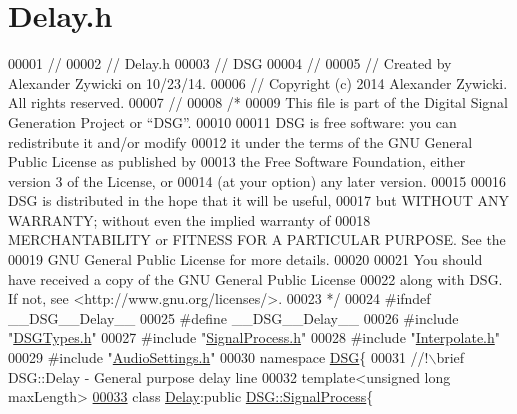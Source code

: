 \hypertarget{_delay_8h_source}{\section{Delay.\+h}
\label{_delay_8h_source}
}

\begin{DoxyCode}
00001 \textcolor{comment}{//}
00002 \textcolor{comment}{//  Delay.h}
00003 \textcolor{comment}{//  DSG}
00004 \textcolor{comment}{//}
00005 \textcolor{comment}{//  Created by Alexander Zywicki on 10/23/14.}
00006 \textcolor{comment}{//  Copyright (c) 2014 Alexander Zywicki. All rights reserved.}
00007 \textcolor{comment}{//}
00008 \textcolor{comment}{/*}
00009 \textcolor{comment}{ This file is part of the Digital Signal Generation Project or “DSG”.}
00010 \textcolor{comment}{}
00011 \textcolor{comment}{ DSG is free software: you can redistribute it and/or modify}
00012 \textcolor{comment}{ it under the terms of the GNU General Public License as published by}
00013 \textcolor{comment}{ the Free Software Foundation, either version 3 of the License, or}
00014 \textcolor{comment}{ (at your option) any later version.}
00015 \textcolor{comment}{}
00016 \textcolor{comment}{ DSG is distributed in the hope that it will be useful,}
00017 \textcolor{comment}{ but WITHOUT ANY WARRANTY; without even the implied warranty of}
00018 \textcolor{comment}{ MERCHANTABILITY or FITNESS FOR A PARTICULAR PURPOSE.  See the}
00019 \textcolor{comment}{ GNU General Public License for more details.}
00020 \textcolor{comment}{}
00021 \textcolor{comment}{ You should have received a copy of the GNU General Public License}
00022 \textcolor{comment}{ along with DSG.  If not, see <http://www.gnu.org/licenses/>.}
00023 \textcolor{comment}{ */}
00024 \textcolor{preprocessor}{#ifndef \_\_DSG\_\_Delay\_\_}
00025 \textcolor{preprocessor}{#define \_\_DSG\_\_Delay\_\_}
00026 \textcolor{preprocessor}{#include "\hyperlink{_d_s_g_types_8h}{DSGTypes.h}"}
00027 \textcolor{preprocessor}{#include "\hyperlink{_signal_process_8h}{SignalProcess.h}"}
00028 \textcolor{preprocessor}{#include "\hyperlink{_interpolate_8h}{Interpolate.h}"}
00029 \textcolor{preprocessor}{#include "\hyperlink{_audio_settings_8h}{AudioSettings.h}"}
00030 \textcolor{keyword}{namespace }\hyperlink{namespace_d_s_g}{DSG}\{\textcolor{comment}{}
00031 \textcolor{comment}{    //!\(\backslash\)brief DSG::Delay - General purpose delay line}
00032 \textcolor{comment}{}    \textcolor{keyword}{template}<\textcolor{keywordtype}{unsigned} \textcolor{keywordtype}{long} maxLength>
\hypertarget{_delay_8h_source_l00033}{}\hyperlink{class_d_s_g_1_1_delay}{00033}     \textcolor{keyword}{class }\hyperlink{class_d_s_g_1_1_delay}{Delay}:\textcolor{keyword}{public} \hyperlink{class_d_s_g_1_1_signal_process}{DSG::SignalProcess}\{

\end{DoxyCode}
